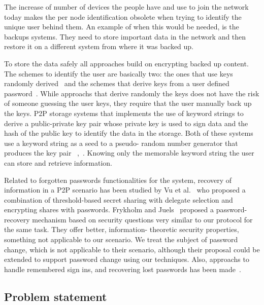 \documentclass[12pt,spanish]{article}
\begin{document}
The increase of number of devices the people have and use to join the network
today makes the per node identification obsolete when trying to identify the
unique user behind them. An example of when this would be needed, is the
backups systems. They need to store important data in the network and then
restore it on a different system from where it was backed up.

To store the data safely all approaches build on encrypting backed up content.
The schemes to identify the user are basically two: the ones that
use keys randomly derived~\cite{Lillibridge:2003:CIB:1247340.1247343} and the schemes that derive
keys from a user defined password~\cite{Cox:2002:PMB:844128.844155}. While
approachs that derive randomly the keys does not have the risk of someone
guessing the user keys, they require that the user manually back up the
keys. 
P2P storage systems that implements the use of keyword strings to derive a
public-private key pair whose private key is used to sign data and the hash of
the public key to identify the data in the storage. Both of
these systems use a keyword string as a seed to a pseudo-
random number generator that produces the key pair ~\cite{clarke2010private},~\cite{Bennett03anencoding}.
Knowing only the memorable keyword string the user can
store and retrieve information.

Related to forgotten passwords functionalities for the system, recovery of
information in a P2P scenario has been studied by Vu et al.~\cite{5380695} who proposed
a combination of threshold-based secret sharing with delegate
selection and encrypting shares with passwords.
Frykholm and Juels~\cite{Frykholm:2001:EPR:501983.501985} proposed a password-recovery
mechanism based on security questions very similar to our
protocol for the same task. They offer better, information-
theoretic security properties, something not applicable to our
scenario. We treat the subject of password change, which is not applicable to
their scenario, although their proposal could be extended to support password
change using our techniques.
Also, approachs to handle
remembered sign ins, and recovering lost passwords has been
made~\cite{kreitz2012passwords}.

\subsection{Problem statement}
\end{document}
